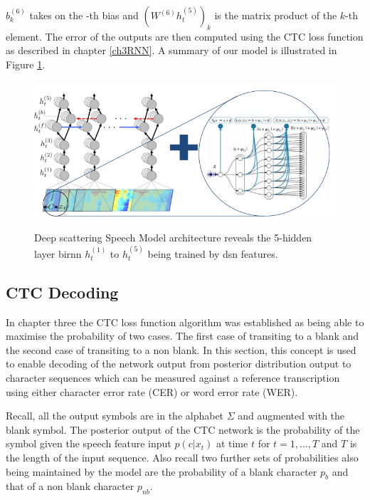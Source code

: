 $b^{(6)}_k$ takes on the -th bias and $(W^{(6)} h^{(5)}_t)_k$ is the matrix product of the $k$-th element.  The error of the outputs are then computed using the CTC loss function \cite{graves_2014} as described in chapter \ref{ch3RNN}.  A summary of our model is illustrated in Figure \ref{fig_6_1_ctc_scatter}.
\begin{figure}
\centering
  \includegraphics[width=14cm]{thesis/images/ctc_scatter.png}\\
  \caption{Deep scattering Speech Model architecture reveals the 5-hidden layer \acrshort{birnn} $h_t^{(1)}$ to $h_t^{(5)}$ being trained by \acrshort{dsn} features.} \label{fig_6_1_ctc_scatter}
\end{figure}

\subsection{CTC Decoding} \label{sec_c7_ctc_decoder}

In chapter three the CTC loss function algorithm was established as being able to maximise the probability of two cases.  The first case of transiting to a blank and the second case of transiting to a non blank.  In this section, this concept is used to enable decoding of the network output from posterior distribution output to character sequences which can be measured against a reference transcription using either character error rate (CER) or word error rate (WER).

Recall, all the output symbols are in the alphabet $\Sigma$ and augmented with the blank symbol. The posterior output of the CTC network is the probability of the symbol given the speech feature input $p(c|x_t)$ at time $t$ for $t=1,\dots,T$ and $T$ is the length of the input sequence.  Also recall two further sets of probabilities also being maintained by the model are the probability of a blank character $p_b$ and that of a non blank character $p_{nb}$.

